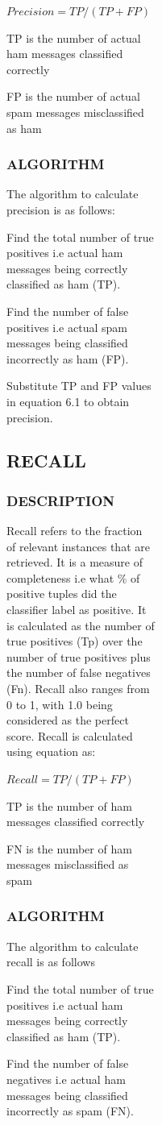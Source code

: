\begin{figure}[h]
\begin{figure}[h]
\begin{figure}[h]
\begin{figure}[h]
$Precision=TP/(TP+FP)$


TP is the number of actual ham messages classified correctly


FP is the number of actual spam messages misclassified as ham


\subsubsection{ALGORITHM}
The algorithm to calculate precision is as follows:


Find the total number of true positives i.e actual ham messages being correctly classified as ham (TP).


Find the number of false positives i.e actual spam messages being classified incorrectly as ham (FP).


Substitute TP and FP values in equation 6.1 to obtain precision.


\subsection{RECALL}
\subsubsection{DESCRIPTION}
Recall refers to the fraction of relevant instances that are retrieved. It is a measure of completeness i.e what \% of positive tuples did the classifier label as positive. It is calculated as the number of true positives (Tp) over the number of true positives plus the number of false negatives (Fn). Recall also ranges from 0 to 1, with 1.0 being considered as the perfect score. Recall is calculated using equation as:


$Recall=TP/(TP+FP)$


TP is the number of ham messages classified correctly


FN is the number of ham messages misclassified as spam


\subsubsection{ALGORITHM}
The algorithm to calculate recall is as follows


Find the total number of true positives i.e actual ham messages being correctly classified as ham (TP).


Find the number of false negatives i.e actual ham messages being classified incorrectly as spam (FN).



\end{figure}
\end{figure}
\end{figure}
\end{figure}

